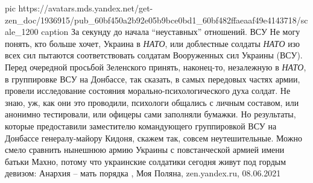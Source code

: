 \ifcmt
  pic https://avatars.mds.yandex.net/get-zen_doc/1936915/pub_60bf450a2b92e05b9bce0bd1_60bf482ffaeaaf49e4143718/scale_1200
  caption За секунду до начала \enquote{неуставных} отношений. ВСУ
\fi
Не могу понять, кто больше хочет, Украина в \emph{НАТО}, или доблестные солдаты \emph{НАТО}
изо всех сил пытаются соответствовать солдатам Вооруженных сил Украины (ВСУ).
Перед очередной просьбой Зеленского принять, наконец-то, незалежную в \emph{НАТО}, в
группировке ВСУ на Донбассе, так сказать, в самых передовых частях армии,
провели исследование состояния морально-психологического духа солдат. Не
знаю, уж, как они это проводили, психологи общались с личным составом, или
анонимно тестировали, или офицеры сами заполняли бумажки. Но результаты,
которые предоставили заместителю командующего группировкой ВСУ на Донбассе
генералу-майору Кидоня, скажем так, совсем неутешительные.  Можно смело
сравнить нынешнюю армию Украины с повстанческой армией имени батьки Махно,
потому что украинские солдатики сегодня живут под гордым девизом: Анархия –
мать порядка
, 
Моя Поляна, zen.yandex.ru, 08.06.2021

